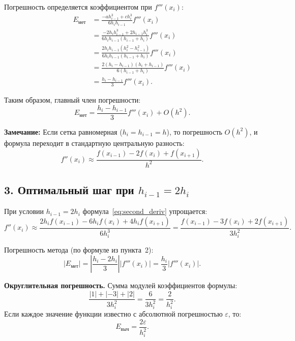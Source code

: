 \documentclass{article}
\begin{document}
Погрешность определяется коэффициентом при $f'''(x_i)$:
\begin{align}
E_{\text{мет}} &= \frac{-a h_{i-1}^3 + c h_i^3}{6 h_i h_{i-1}} f'''(x_i) \nonumber \\
&= \frac{-2 h_i h_{i-1}^3 + 2 h_{i-1} h_i^3}{6 h_i h_{i-1} (h_{i-1} + h_i)} f'''(x_i) \nonumber \\
&= \frac{2 h_i h_{i-1} (h_i^2 - h_{i-1}^2)}{6 h_i h_{i-1} (h_{i-1} + h_i)} f'''(x_i) \nonumber \\
&= \frac{2 (h_i - h_{i-1})(h_i + h_{i-1})}{6 (h_{i-1} + h_i)} f'''(x_i) \nonumber \\
&= \frac{h_i - h_{i-1}}{3} f'''(x_i).
\end{align}

Таким образом, главный член погрешности:
\begin{equation}
\boxed{E_{\text{мет}} = \frac{h_i - h_{i-1}}{3} f'''(x_i) + O(h^2).}
\end{equation}

\textbf{Замечание:} Если сетка равномерная ($h_i = h_{i-1} = h$), то погрешность $O(h^2)$, и формула переходит в стандартную центральную разность:
\begin{equation}
f''(x_i) \approx \frac{f(x_{i-1}) - 2 f(x_i) + f(x_{i+1})}{h^2}.
\end{equation}

\subsection*{3. Оптимальный шаг при $h_{i-1} = 2h_i$}

При условии $h_{i-1} = 2h_i$ формула~\eqref{eq:second_deriv} упрощается:
\begin{equation}
f''(x_i) \approx \frac{2h_i f(x_{i-1}) - 6h_i f(x_i) + 4h_i f(x_{i+1})}{6h_i^3}
= \frac{f(x_{i-1}) - 3f(x_i) + 2f(x_{i+1})}{3h_i^2}.
\end{equation}

Погрешность метода (по формуле из пункта~2):
\begin{equation}
|E_{\text{мет}}| = \left|\frac{h_i - 2h_i}{3}\right| |f'''(x_i)| = \frac{h_i}{3} |f'''(x_i)|.
\end{equation}

\textbf{Округлительная погрешность.} Сумма модулей коэффициентов формулы:
\begin{equation}
\frac{|1| + |-3| + |2|}{3h_i^2} = \frac{6}{3h_i^2} = \frac{2}{h_i^2}.
\end{equation}
Если каждое значение функции известно с абсолютной погрешностью $\varepsilon$, то:
\begin{equation}
E_{\text{выч}} = \frac{2\varepsilon}{h_i^2}.
\end{equation}
\end{document}
